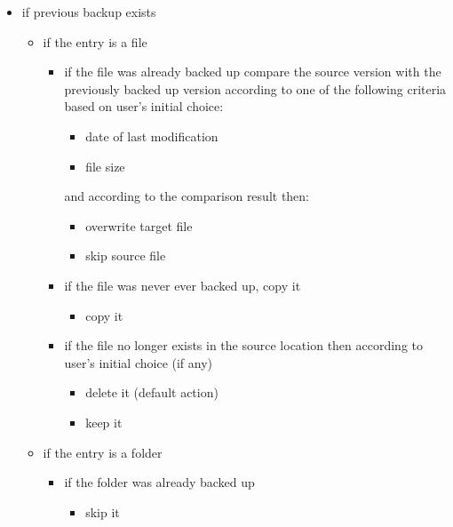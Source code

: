 \documentclass[a4paper]{article}
\begin{document}
        \begin{itemize}
          \item if previous backup exists
            \begin{itemize}
              \item if the entry is a file
                \begin{itemize}
                  \item if the file was already backed up compare the source version with the previously backed up version according to one of the following criteria based on user's initial choice:
                    \begin{itemize}
                      \item date of last modification
                      \item file size
                    \end{itemize}
                    and according to the comparison result then:
                    \begin{itemize}
                      \item overwrite target file
                      \item skip source file
                    \end{itemize}  
                  \item if the file was never ever backed up, copy it
                    \begin{itemize}
                      \item copy it
                    \end{itemize}
                  \item if the file no longer exists in the source location then according to user's initial choice (if any)
                    \begin{itemize}
                      \item delete it (default action)
                      \item keep it
                    \end{itemize}
                \end{itemize}
              \item if the entry is a folder
                \begin{itemize}
                  \item if the folder was already backed up
                    \begin{itemize}
                      \item skip it  

\end{itemize}
\end{itemize}
\end{itemize}
\end{itemize}
\end{document}
